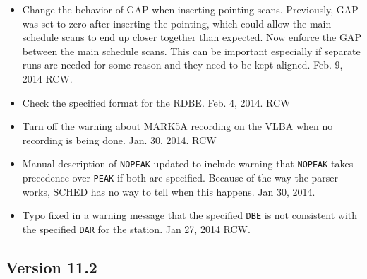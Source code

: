 \documentclass{report}
\begin{document}
\begin{itemize}
\item  Change the behavior of GAP when inserting pointing scans.  Previously,
GAP was set to zero after inserting the pointing, which could allow the
main schedule scans to end up closer together than expected.  Now enforce 
the GAP between the main schedule scans.  This can be important especially
if separate runs are needed for some reason and they need to be kept aligned.
Feb. 9, 2014  RCW.

\item  Check the specified format for the RDBE.  Feb. 4, 2014. RCW

\item  Turn off the warning about MARK5A recording on the VLBA when
no recording is being done.  Jan. 30, 2014.  RCW

\item  Manual description of {\tt NOPEAK} updated to include warning
that {\tt NOPEAK} takes precedence over {\tt PEAK} if both are specified.
Because of the way the parser works, SCHED has no way to tell when this
happens.  Jan 30, 2014.

\item Typo fixed in a warning message that the specified {\tt DBE}
is not consistent with the specified {\tt DAR} for the station.
Jan 27, 2014  RCW.

\end{itemize}

\subsection{\label{SSEC:VER_11.2}Version 11.2}
\end{document}
